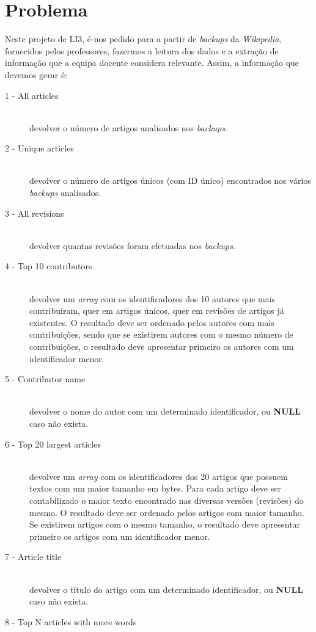 \documentclass[a4paper]{article}
\begin{document}
\section{Problema}
\label{sec:problema}
Neste projeto de LI3, é-nos pedido para a partir de \textit{backups} da \textit{Wikipedia}, fornecidos pelos professores, fazermos a leitura dos dados e a extração de informação que a equipa docente considera relevante. Assim, a informação que devemos gerar é:
\begin{description}
    \item[1 - All articles]\hfill \\
    devolver o número de artigos analisados nos \textit{backups}.
    \item[2 - Unique articles]\hfill \\
    devolver o número de artigos únicos (com ID único) encontrados nos vários \textit{backups} analisados.
    \item[3 - All revisions]\hfill \\
    devolver quantas revisões foram efetuadas nos \textit{backups}.
    \item[4 - Top 10 contributors]\hfill \\
    devolver um \textit{array} com os identificadores dos 10 autores que mais contribuíram, quer em artigos únicos, quer em revisões de artigos já existentes. O resultado deve ser ordenado pelos autores com mais contribuições, sendo que se existirem autores com o mesmo número de contribuições, o resultado deve apresentar primeiro os autores com um identificador menor.
    \item[5 - Contributor name]\hfill \\
    devolver o nome do autor com um determinado identificador, ou \textbf{NULL} caso não exista.
    \item[6 - Top 20 largest articles]\hfill \\
    devolver um \textit{array} com os identificadores dos 20 artigos que possuem textos com um maior tamanho em bytes. Para cada artigo deve ser contabilizado o maior texto encontrado nas diversas versões (revisões) do mesmo. O resultado deve ser ordenado pelos artigos com maior tamanho. Se existirem artigos com o mesmo tamanho, o resultado deve apresentar primeiro os artigos com um identificador menor.
    \item[7 - Article title]\hfill \\
    devolver o título do artigo com um determinado identificador, ou \textbf{NULL} caso não exista.
    \item[8 - Top N articles with more words]\hfill \\

\end{description}
\end{document}
